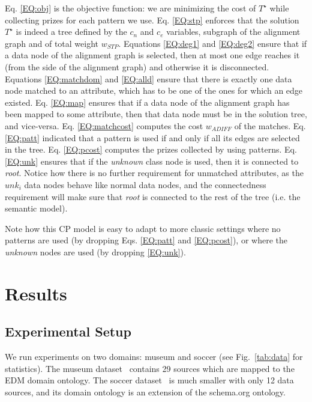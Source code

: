 \documentclass[letterpaper]{article} %
\newcommand{\ignore}[1]{}
\begin{document}
Eq. \ref{EQ:obj} is the objective function: we are minimizing the cost 
of $T^\star$ while collecting prizes for each pattern we use. Eq. \ref{EQ:stp} 
enforces that the solution 
$T^\star$ is indeed a tree defined by the $c_n$ and $c_e$ variables, subgraph 
of the alignment graph 
and of total weight $w_{STP}$. Equations \ref{EQ:deg1} and \ref{EQ:deg2} ensure 
that if a data node of the alignment graph is selected, then at most one edge 
reaches it (from the side of the alignment graph) and otherwise it is 
disconnected. \ignore{Eq. \ref{EQ:matchdom} ensures that the domain of each 
variable in 
the array $match$ corresponds to a subset of data nodes of the alignment graph 
for which there is an edge connecting to the attribute at hand. Eq. 
\ref{EQ:alld} ensure that each attribute is mapped to exactly one data node of 
the alignment graph.} Equations \ref{EQ:matchdom} and \ref{EQ:alld} ensure that 
there is exactly one data node matched to an attribute, which has to be one of 
the ones for which an edge existed. Eq. \ref{EQ:map} ensures that 
if a data node of the alignment graph has been mapped to some attribute, then 
that data node must be in the solution tree, and vice-versa. Eq. 
\ref{EQ:matchcost} computes the cost $w_{ADIFF}$ of the matches.
Eq. \ref{EQ:patt} indicated that a pattern is used if and only if all its edges 
are selected in the tree. Eq. \ref{EQ:pcost} computes the prizes collected by using patterns.
Eq. \ref{EQ:unk} ensures that if the \emph{unknown} class node is used, then it 
is connected to \emph{root}.
Notice how there is no further requirement for unmatched attributes, as the 
$unk_i$ data nodes behave like normal data nodes, and the connectedness 
requirement will make sure that \emph{root} is connected to the rest of the 
tree (i.e. the semantic model).

Note how this CP model is easy to adapt to more classic settings where no 
patterns are used (by dropping Eqs. \ref{EQ:patt} and \ref{EQ:pcost}), or where 
the \emph{unknown} nodes are used (by dropping \ref{EQ:unk}).
\section{Results \label{SEC:Res}}

\subsection{Experimental Setup}

We run experiments on two domains: museum and soccer (see Fig.~\ref{tab:data} for statistics).
The museum dataset~\cite{taheriyan2016learning} contains 29 sources which are mapped to the EDM domain ontology.
The soccer dataset~\cite{Pham:semantic} is much smaller with only 12 data sources, and its domain ontology is an extension of the schema.org ontology.
\end{document}

